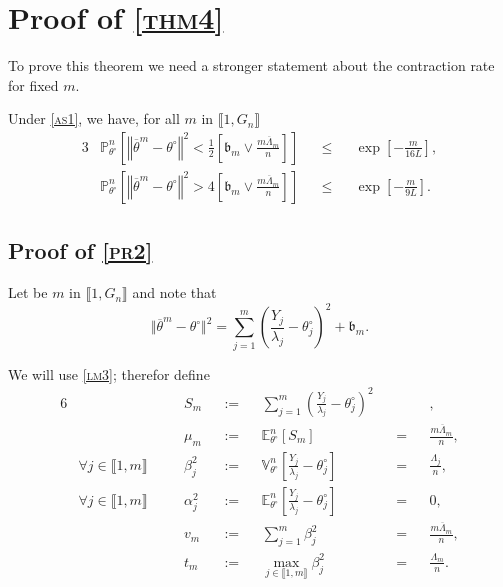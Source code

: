 \section{Proof of \textsc{\cref{thm4}}}

To prove this theorem we need a stronger statement about the contraction rate for fixed $m$.

\begin{pr}\label{pr2}
Under \textsc{\cref{as1}}, we have, for all $m$ in $\llbracket 1, G_{n} \rrbracket$
\begin{alignat*}{3}
&\mathds{P}_{\theta^{\circ}}^{n}\left[\left\Vert \overline{\theta}^{m} - \theta^{\circ} \right\Vert^{2} < \frac{1}{2}\left[\mathfrak{b}_{m} \vee \frac{m \overline{\Lambda}_{m}}{n}\right]\right] &&\leq&& \exp\left[-\frac{m}{16 L}\right],\\
&\mathds{P}_{\theta^{\circ}}^{n}\left[\left\Vert \overline{\theta}^{m} - \theta^{\circ} \right\Vert^{2} > 4 \left[\mathfrak{b}_{m} \vee \frac{m \overline{\Lambda}_{m}}{n}\right]\right] &&\leq&& \exp\left[-\frac{m}{9 L}\right].
\end{alignat*}
\end{pr}

\subsection{Proof of \textsc{\cref{pr2}}}
Let be $m$ in $\llbracket 1, G_{n} \rrbracket$ and note that
\[\Vert \overline{\theta}^{m} - \theta^{\circ} \Vert^{2} = \sum\limits_{j = 1}^{m} \left(\frac{Y_{j}}{\lambda_{j}} - \theta^{\circ}_{j}\right)^{2} + \mathfrak{b}_{m}.\]

We will use \textsc{\cref{lm3}}; therefor define 
\begin{alignat*}{6}
& &&S_{m} &&:=&& \sum\limits_{j = 1}^{m} \left(\frac{Y_{j}}{\lambda_{j}} - \theta^{\circ}_{j}\right)^{2}&& &&,\\
& &&\mu_{m}&&:=&&\mathds{E}_{\theta^{\circ}}^{n}\left[S_{m}\right] &&=&& \frac{m \overline{\Lambda}_{m}}{n},\\
& \forall j \in \llbracket 1, m \rrbracket \quad && \beta_{j}^{2} &&:=&& \mathds{V}_{\theta^{\circ}}^{n}\left[\frac{Y_{j}}{\lambda_{j}} - \theta^{\circ}_{j}\right] &&=&& \frac{\Lambda_{j}}{n},\\
& \forall j \in \llbracket 1, m \rrbracket \quad && \alpha_{j}^{2} &&:=&& \mathds{E}_{\theta^{\circ}}^{n}\left[\frac{Y_{j}}{\lambda_{j}} - \theta^{\circ}_{j}\right] &&=&& 0,\\
& && v_{m} &&:=&& \sum\limits_{j = 1}^{m}\beta_{j}^{2} &&=&& \frac{m \overline{\Lambda}_{m}}{n},\\
& && t_{m} &&:=&& \max\limits_{j \in \llbracket 1, m \rrbracket}\beta_{j}^{2} &&=&& \frac{\Lambda_{m}}{n}.
\end{alignat*}


